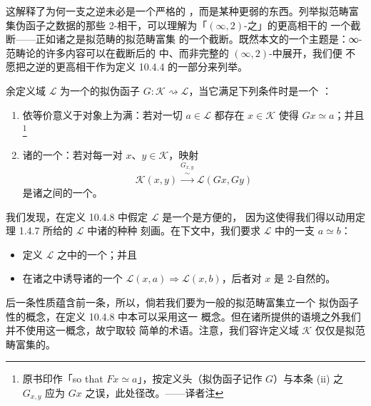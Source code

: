 这解释了为何一支\trCosmologicalBiequivalence{}之逆未必是一个严格的%
\trSimplicialFunctor，而是某种更弱的东西。列举拟范畴富集伪函子之数据的那些
2-\trCell{}相干，可以理解为「$(\infty,2)$-\trCategory{}之\trFunctor」的更高相干的
一个截断——正如诸\trQuasiCategory{}之\trHomotopyTwoCategory{}是拟范畴的拟范畴富集%
\trCategory{}的一个截断。既然本文的一个主题是：∞-范畴论的许多内容可以在截断后的%
\trHomotopyTwoCategory{}中、而非完整的 $(\infty,2)$-\trCategory{}中展开，我们便
不愿把\trCosmologicalBiequivalence{}之逆的更高相干作为定义 10.4.4 的一部分来列举。

\begin{definition}\label{def:quasi-biequivalence}
余定义域 $\mathcal{L}$ 为一个\trInfinityCosmos{}的拟伪函子
$G\colon\mathcal{K}\rightsquigarrow\mathcal{L}$，当它满足下列条件时是一个%
\textbf{\trBiequivalence}：
\begin{enumerate}[label=(\roman*)]
\item 依等价意义于对象上为满：若对一切 $a\in\mathcal{L}$ 都存在 $x\in\mathcal{K}$
使得 $Gx\simeq a$；并且
\footnote{原书印作「so that $Fx\simeq a$」，按定义头（拟伪函子记作 $G$）与本条
(ii) 之 $G_{x,y}$ 应为 $Gx$ 之误，此处径改。——译者注}
\item 诸\trQuasiCategory{}的一个\trLocalEquivalence：若对每一对 $x$、$y\in\mathcal{K}$，映射
\begin{equation*}
\mathcal{K}(x,y)\overset{G_{x,y}}{\xrightarrow{\ \sim\ }}\mathcal{L}(Gx,Gy)
\end{equation*}
是诸\trQuasiCategory{}之间的一个\trEquivalence。
\end{enumerate}
\end{definition}
\begin{remark}\label{rem:quasi-biequivalence-cosmos-codomain}
我们发现，在定义 10.4.8 中假定 $\mathcal{L}$ 是一个\trInfinityCosmos{}是方便的，
因为这使得我们得以动用定理 1.4.7 所给的 $\mathcal{L}$ 中诸\trEquivalence{}的种种
刻画。在下文中，我们要求 $\mathcal{L}$ 中的一支\trEquivalence{} $a\simeq b$：
\begin{itemize}
\item 定义 $\mathcal{L}$ 之\trHomotopyTwoCategory{}中的一个\trEquivalence；并且
\item 在诸\trQuasiCategory{}之\trHomotopyTwoCategory{}中诱导诸\trQuasiCategory{}的一个\trEquivalence{}
$\mathcal{L}(x,a)\Rightarrow\mathcal{L}(x,b)$，后者对 $x$ 是 2-自然的。
\end{itemize}
后一条性质蕴含前一条，所以，倘若我们要为一般的拟范畴富集\trCategory{}立一个
拟伪函子性\trBiequivalence{}的概念，在定义 10.4.8 中本可以采用这一\trEquivalence{}%
概念。但在诸\trInfinityCosmos{}所提供的语境之外我们并不使用这一概念，故宁取较
简单的术语。注意，我们容许定义域 $\mathcal{K}$ 仅仅是拟范畴富集的。
\end{remark}


